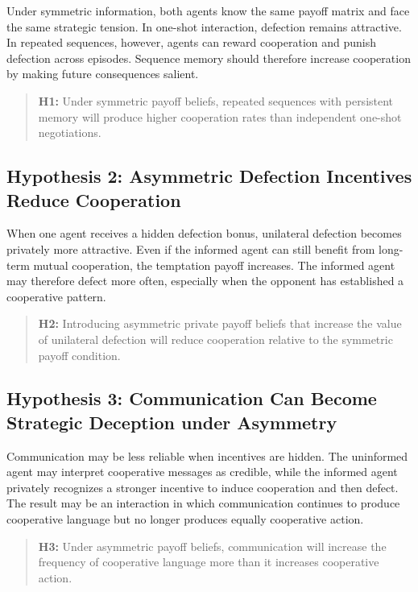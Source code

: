\documentclass[12pt,a4paper]{article}
\begin{document}
Under symmetric information, both agents know the same payoff matrix and face the same strategic tension. In one-shot interaction, defection remains attractive. In repeated sequences, however, agents can reward cooperation and punish defection across episodes. Sequence memory should therefore increase cooperation by making future consequences salient.

\begin{quote}
\textbf{H1:} Under symmetric payoff beliefs, repeated sequences with persistent memory will produce higher cooperation rates than independent one-shot negotiations.
\end{quote}

\subsection{Hypothesis 2: Asymmetric Defection Incentives Reduce Cooperation}

When one agent receives a hidden defection bonus, unilateral defection becomes privately more attractive. Even if the informed agent can still benefit from long-term mutual cooperation, the temptation payoff increases. The informed agent may therefore defect more often, especially when the opponent has established a cooperative pattern.

\begin{quote}
\textbf{H2:} Introducing asymmetric private payoff beliefs that increase the value of unilateral defection will reduce cooperation relative to the symmetric payoff condition.
\end{quote}

\subsection{Hypothesis 3: Communication Can Become Strategic Deception under Asymmetry}

Communication may be less reliable when incentives are hidden. The uninformed agent may interpret cooperative messages as credible, while the informed agent privately recognizes a stronger incentive to induce cooperation and then defect. The result may be an interaction in which communication continues to produce cooperative language but no longer produces equally cooperative action.

\begin{quote}
\textbf{H3:} Under asymmetric payoff beliefs, communication will increase the frequency of cooperative language more than it increases cooperative action.
\end{quote}
\end{document}
